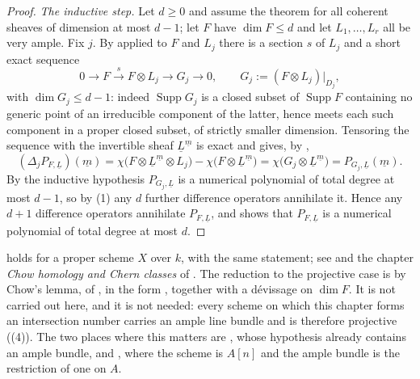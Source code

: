 \begin{proof}
\emph{The inductive step.}  Let $d\geq0$ and assume the theorem for all
coherent sheaves of dimension at most $d-1$; let $F$ have $\dim F\leq d$ and
let $L_1,\dots,L_r$ all be very ample.  Fix $j$.  By
 applied to $F$ and $L_j$ there is a section
$s$ of $L_j$ and a short exact sequence
\[
  0\longrightarrow F\stackrel{s}{\longrightarrow}F\otimes L_j
  \longrightarrow G_j\longrightarrow0,\qquad
  G_j:=(F\otimes L_j)|_{D_j},
\]
with $\dim G_j\leq d-1$: indeed $\operatorname{Supp}G_j$ is a closed subset of
$\operatorname{Supp}F$ containing no generic point of an irreducible component
of the latter, hence meets each such component in a proper closed subset, of
strictly smaller dimension.  Tensoring the sequence with the invertible sheaf
$\underline L^{\underline m}$ is exact and gives, by
,
\[
  (\Delta_jP_{F,\underline L})(\underline m)
  =\chi\bigl(F\otimes\underline L^{\underline m}\otimes L_j\bigr)
  -\chi\bigl(F\otimes\underline L^{\underline m}\bigr)
  =\chi\bigl(G_j\otimes\underline L^{\underline m}\bigr)
  =P_{G_j,\underline L}(\underline m).
\]
By the inductive hypothesis $P_{G_j,\underline L}$ is a numerical polynomial of
total degree at most $d-1$, so by
(1) any $d$ further difference operators
annihilate it.  Hence any $d+1$ difference operators annihilate
$P_{F,\underline L}$, and  shows that
$P_{F,\underline L}$ is a numerical polynomial of total degree at most $d$.
\end{proof}

\begin{remark}\label{rem:deg-snapper-proper}
 holds for a proper scheme $X$ over $k$, with the same
statement; see \cite[\S1]{KleimanAmpleness} and the chapter \emph{Chow homology
and Chern classes} of \cite{stacks-project}.  The reduction to the projective
case is by Chow's lemma,  of , in
the form , together with a d\'evissage on
$\dim F$.  It is not carried out here, and it is not needed: every scheme on
which this chapter forms an intersection number carries an ample line bundle
and is therefore projective ((4)).  The two places
where this matters are , whose hypothesis
already contains an ample bundle, and , where the
scheme is $A[n]$ and the ample bundle is the restriction of one on $A$.
\end{remark}

